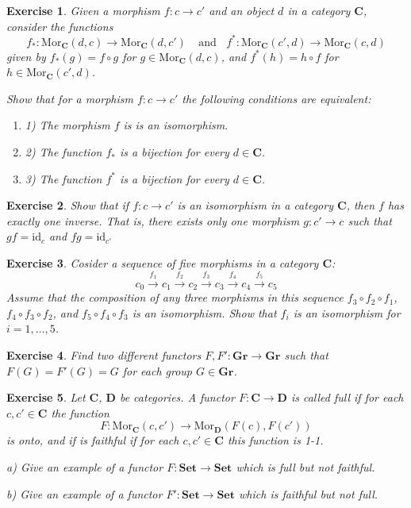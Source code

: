\documentclass[11pt, letterpaper, oneside]{report}
\theoremstyle{pplain}
\theoremstyle{ddefinition}
\theoremstyle{nnn}
\theoremstyle{eexercise}
\newtheorem{exercise}{Exercise}[chapter]
\newcommand{\Mor}{\mathrm{Mor}}
\newcommand{\id}{\mathrm{id}}
\newcommand{\CC}{{\mathbf C}}
\newcommand{\DD}{{\mathbf D}}
\newcommand{\Gr}{{\mathbf{Gr}}}
\newcommand{\Set}{{\mathbf{Set}}}
\newcommand{\benu}{\begin{enumerate}}
\newcommand{\eenu}{\end{enumerate}}
\begin{document}
\begin{exercise}
Given  a morphism  $f\colon c \to c'$ and an object $d$ in a category $\CC$, consider the functions 
$$f_{\ast}\colon \Mor_{\CC}(d, c) \to \Mor_{\CC}(d, c') \ \ \ \ \ \text{and}  \ \ \ \ 
f^{\ast}\colon \Mor_{\CC}(c', d) \to \Mor_{\CC}(c, d)$$
given by $f_{\ast}(g) = f\circ g$  for $g \in  \Mor_{\CC}(d, c)$, 
and $f^{\ast}(h) = h\circ f$ for $h \in  \Mor_{\CC}(c', d)$. 

Show that  for a  morphism $f\colon c \to c'$  the following conditions are equivalent:
\benu
\item[1)] The morphism $f$ is is an isomorphism.
\item[2)] The function $f_{\ast}$ is a bijection for every $d\in \CC$.
\item[3)] The function $f^{\ast}$ is a bijection for every $d\in \CC$. 
\eenu
\end{exercise}


\begin{exercise}
Show that if $f\colon c \to c'$ is an isomorphism in a category $\CC$, then $f$ has exactly
one inverse. That is, there exists only one morphism $g\colon c' \to c$ such that 
$gf= \id_{c}$ and $fg = \id_{c'}$
\end{exercise}



\begin{exercise}
Cosider a sequence of five morphisms in a category $\CC$:
$$
c_{0} \xrightarrow{f_{1}} 
c_{1} \xrightarrow{f_{2}} 
c_{2} \xrightarrow{f_{3}} 
c_{3} \xrightarrow{f_{4}} 
c_{4} \xrightarrow{f_{5}} 
c_{5}
$$
Assume that the composition of any three morphisms in this sequence $f_{3}\circ f_{2}\circ f_{1}$, 
$f_{4}\circ f_{3}\circ f_{2}$, and $f_{5}\circ f_{4}\circ f_{3}$ is an isomorphism. Show that 
$f_{i}$ is an isomorphism for $i=1,\dots, 5$.
\end{exercise}

\begin{exercise}
Find two different functors $F, F' \colon \Gr \to \Gr$ such that $F(G) = F'(G) = G$ for each group 
$G\in \Gr$.  
\end{exercise}





\begin{exercise}
\label{FULL FAITHFUL EXERCISE}
Let $\CC$, $\DD$ be categories. A functor $F\colon \CC \to \DD$ is called \emph{full} if for each 
$c, c'\in \CC$ the function 
$$F\colon \Mor_{\CC}(c, c') \to \Mor_{\DD}(F(c), F(c'))$$
is onto, and if is \emph{faithful} if for each $c, c'\in \CC$ this function is 1-1. 

a) Give an example of a functor $F\colon \Set \to \Set$ which is full but not faithful. 

b) Give an example of a functor $F'\colon \Set \to \Set$ which is faithful but not full. 

\end{exercise}
\end{document}
